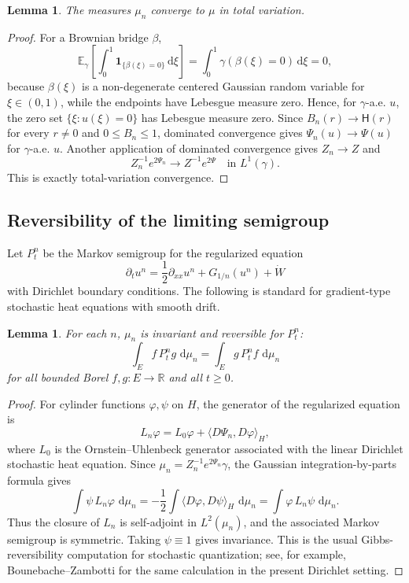 \documentclass[12pt]{article}
\numberwithin{equation}{section}
\newtheorem{lemma}[theorem]{Lemma}
\newcommand{\dd}{\,\mathrm d}
\newcommand{\1}{\mathbf 1}
\newcommand{\E}{\mathbb E}
\newcommand{\R}{\mathbb R}
\begin{document}
\begin{lemma}\label{lem:mu-n-tv}
The measures $\mu_n$ converge to $\mu$ in total variation.
\end{lemma}

\begin{proof}
For a Brownian bridge $\beta$,
\[
    \E_\gamma\!\left[\int_0^1 \1_{\{\beta(\xi)=0\}}\dd \xi\right]
    =\int_0^1 \gamma(\beta(\xi)=0)\dd \xi=0,
\]
because $\beta(\xi)$ is a non-degenerate centered Gaussian random variable for
$\xi\in(0,1)$, while the endpoints have Lebesgue measure zero. Hence, for
$\gamma$-a.e. $u$, the zero set $\{\xi:u(\xi)=0\}$ has Lebesgue measure zero.
Since $B_n(r)\to \mathsf H(r)$ for every $r\neq0$ and $0\leq B_n\leq1$, dominated
convergence gives $\Psi_n(u)\to\Psi(u)$ for $\gamma$-a.e. $u$. Another application
of dominated convergence gives $Z_n\to Z$ and
\[
        Z_n^{-1}e^{2\Psi_n}\longrightarrow Z^{-1}e^{2\Psi}
        \quad\text{in }L^1(\gamma).
\]
This is exactly total-variation convergence.
\end{proof}

\subsection{Reversibility of the limiting semigroup}

Let $P_t^n$ be the Markov semigroup for the regularized equation
\[
    \partial_t u^n=\frac12\partial_{xx}u^n+G_{1/n}(u^n)+\dot W
\]
with Dirichlet boundary conditions. The following is standard for gradient-type
stochastic heat equations with smooth drift.

\begin{lemma}\label{lem:approx-reversible}
For each $n$, $\mu_n$ is invariant and reversible for $P_t^n$:
\[
        \int_E f\,P_t^n g\,\dd\mu_n
        =
        \int_E g\,P_t^n f\,\dd\mu_n
\]
for all bounded Borel $f,g:E\to\R$ and all $t\geq0$.
\end{lemma}

\begin{proof}
For cylinder functions $\varphi,\psi$ on $H$, the generator of the regularized
equation is
\[
        L_n\varphi=L_0\varphi+\langle D\Psi_n,D\varphi\rangle_H,
\]
where $L_0$ is the Ornstein--Uhlenbeck generator associated with the linear
Dirichlet stochastic heat equation. Since $\mu_n=Z_n^{-1}e^{2\Psi_n}\gamma$, the
Gaussian integration-by-parts formula gives
\[
        \int \psi\,L_n\varphi\,\dd\mu_n
        =
        -\frac12\int \langle D\varphi,D\psi\rangle_H\,\dd\mu_n
        =
        \int \varphi\,L_n\psi\,\dd\mu_n .
\]
Thus the closure of $L_n$ is self-adjoint in $L^2(\mu_n)$, and the associated
Markov semigroup is symmetric. Taking $\psi\equiv1$ gives invariance. This is the
usual Gibbs-reversibility computation for stochastic quantization; see, for example,
Bounebache--Zambotti \cite[Section 4]{BZ14} for the same calculation in the present
Dirichlet setting.
\end{proof}
\end{document}
